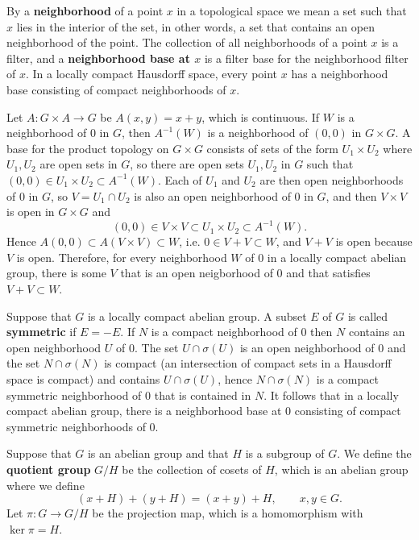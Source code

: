 \documentclass{article}
\begin{document}
By a \textbf{neighborhood} of a point $x$ in a topological space we mean a set such that $x$ lies in the interior of the set, in other words, a set that contains an open neighborhood of the point.
The collection of all neighborhoods of a point $x$ is a filter, and a \textbf{neighborhood base at $x$} is a filter base for the neighborhood filter of $x$.
In a locally compact Hausdorff space, every point $x$ has a neighborhood base  consisting of 
compact neighborhoods of $x$. 

Let $A:G \times A \to G$ be $A(x,y)=x+y$, which is continuous. 
If $W$ is a neighborhood of $0$ in $G$, then $A^{-1}(W)$ is a neighborhood of $(0,0)$ in $G \times G$. A base for the product
topology on $G \times G$ consists of sets of the form $U_1 \times U_2$ where $U_1,U_2$ are open sets in $G$, so there are open sets $U_1,U_2$ in $G$ such that
$(0,0) \in U_1 \times U_2 \subset A^{-1}(W)$. Each of $U_1$ and $U_2$ are then open neighborhoods of $0$ in $G$, so $V=U_1 \cap U_2$ is also an open neighborhood
of $0$ in $G$, and then $V \times V$ is open in $G \times G$ and
\[
(0,0) \in V \times V \subset U_1 \times U_2 \subset A^{-1}(W).
\]
Hence $A(0,0) \subset A(V \times V) \subset W$, i.e. $0 \in V+V \subset W$, and $V+V$ is open because $V$ is open. Therefore, for every neighborhood $W$ of $0$ in a locally
compact abelian group, there is some $V$ that is an open neigborhood of $0$ and that satisfies $V+V \subset W$. 

Suppose that $G$ is a locally compact abelian group.
A subset $E$ of $G$ is called \textbf{symmetric} if $E=-E$. 
If $N$ is a compact neighborhood of $0$ then $N$ contains an open neighborhood $U$ of $0$.
The set $U \cap \sigma(U)$ is an open neighborhood of
$0$ and the set $N \cap \sigma(N)$ is compact (an intersection of compact sets in a Hausdorff space is compact) and contains
$U \cap \sigma(U)$, hence $N \cap \sigma(N)$ is a compact symmetric neighborhood of $0$ that is contained in $N$. It follows that in a locally compact abelian group, there is a neighborhood base at $0$  consisting of compact symmetric neighborhoods of $0$.

Suppose that $G$ is an abelian group and that $H$ is a  subgroup of $G$. We define the \textbf{quotient group}
 $G/H$ be the collection of cosets of $H$,
which is an abelian group where we define
\[
(x+H)+(y+H) = (x+y) + H, \qquad x,y \in G.
\]
Let $\pi:G \to G/H$ be the projection map, which is a homomorphism with $\ker \pi = H$.
\end{document}
